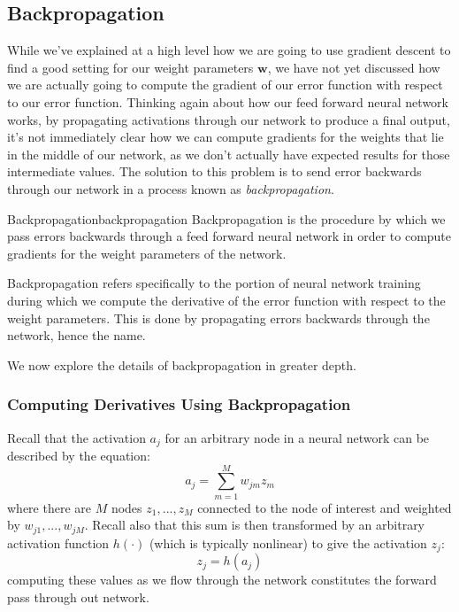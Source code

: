 \subsection{Backpropagation}
While we've explained at a high level how we are going to use gradient descent to find a good setting for our weight parameters $\textbf{w}$, we have not yet discussed how we are actually going to compute the gradient of our error function with respect to our error function. Thinking again about how our feed forward neural network works, by propagating activations through our network to produce a final output, it's not immediately clear how we can compute gradients for the weights that lie in the middle of our network, as we don't actually have expected results for those intermediate values. The solution to this problem is to send error backwards through our network in a process known as \textit{backpropagation}.

\begin{definition}{Backpropagation}{backpropagation}
Backpropagation is the procedure by which we pass errors backwards through a feed forward neural network in order to compute gradients for the weight parameters of the network.
\end{definition}

Backpropagation refers specifically to the portion of neural network training during which we compute the derivative of the error function with respect to the weight parameters. This is done by propagating errors backwards through the network, hence the name.


We now explore the details of backpropagation in greater depth.

\subsubsection{Computing Derivatives Using Backpropagation}
Recall that the activation $a_{j}$ for an arbitrary node in a neural network can be described by the equation:
\begin{equation} \label{activations-reminder}
	a_{j} = \sum_{m=1}^{M} w_{jm} z_{m}
\end{equation}
where there are $M$ nodes $z_{1}, ..., z_{M}$ connected to the node of interest and weighted by $w_{j1}, ..., w_{jM}$. Recall also that this sum is then transformed by an arbitrary activation function $h(\cdot)$ (which is typically nonlinear) to give the activation $z_{j}$:
\begin{equation} \label{transformed-activations-reminder}
	z_{j} = h(a_{j})
\end{equation}
computing these values as we flow through the network constitutes the forward pass through out network.

